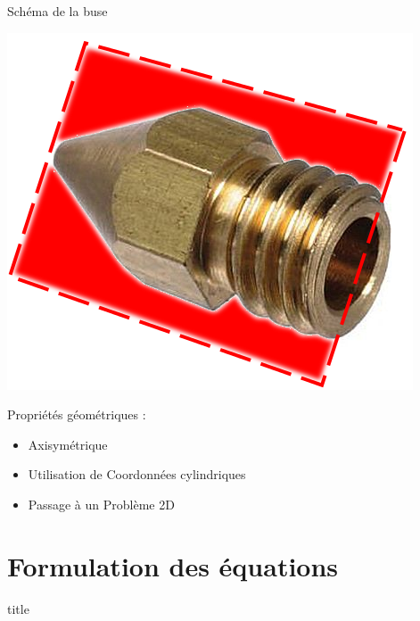 \documentclass[french]{beamer}
\begin{document}
\begin{frame}{Schéma de la buse}
  \begin{minipage}{0.48\textwidth}
    \includegraphics[scale=0.3]{images/buseCoupe.png}
  \end{minipage}
  \begin{minipage}{0.48\textwidth}
    Propriétés géométriques :
    \begin{itemize}
      \item Axisymétrique
	\pause
      \item Utilisation de Coordonnées cylindriques
	\pause
      \item Passage à un Problème 2D
    \end{itemize}
  \end{minipage}
\end{frame}


\section{Formulation des équations}
\begin{frame}
  \vfill
  \centering
  \begin{beamercolorbox}[sep=8pt,center,shadow=true,rounded=true]{title}
    \insertsectionhead
  \end{beamercolorbox}
  \vfill
\end{frame}
\end{document}
